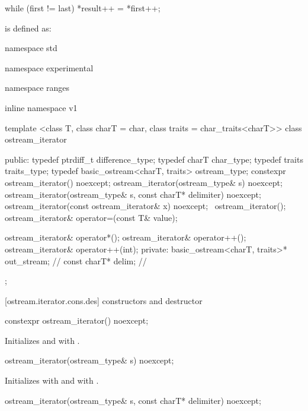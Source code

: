 \begin{codeblock}
while (first != last)
  *result++ = *first++;
\end{codeblock}

\pnum
{}
is defined as:

\begin{codeblock}
namespace std { namespace experimental { namespace ranges { inline namespace v1 {
  template <class T, class charT = char, class traits = char_traits<charT>>
  class ostream_iterator {
  public:
    typedef ptrdiff_t difference_type;
    typedef charT char_type;
    typedef traits traits_type;
    typedef basic_ostream<charT, traits> ostream_type;
    constexpr ostream_iterator() noexcept;
    ostream_iterator(ostream_type& s) noexcept;
    ostream_iterator(ostream_type& s, const charT* delimiter) noexcept;
    ostream_iterator(const ostream_iterator& x) noexcept;
    ~ostream_iterator();
    ostream_iterator& operator=(const T& value);

    ostream_iterator& operator*();
    ostream_iterator& operator++();
    ostream_iterator& operator++(int);
  private:
    basic_ostream<charT, traits>* out_stream;  // \expos
    const charT* delim;                        // \expos
  };
}}}}
\end{codeblock}

[ostream.iterator.cons.des]{ constructors and destructor}

%
\begin{itemdecl}
constexpr ostream_iterator() noexcept;
\end{itemdecl}

\begin{itemdescr}
\pnum
\effects
Initializes  and  with .
\end{itemdescr}

%
\begin{itemdecl}
ostream_iterator(ostream_type& s) noexcept;
\end{itemdecl}

\begin{itemdescr}
\pnum
\effects
Initializes  with  and  with .
\end{itemdescr}

%
\begin{itemdecl}
ostream_iterator(ostream_type& s, const charT* delimiter) noexcept;
\end{itemdecl}

